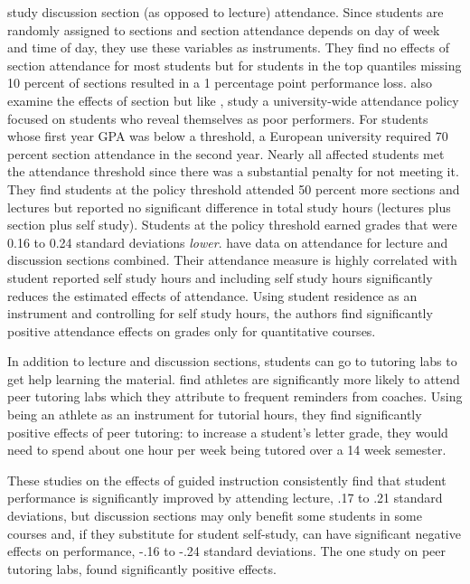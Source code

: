 \documentclass[12pt]{article}
\begin{document}
\textcite{ans2012} study discussion section (as opposed to lecture) attendance. Since students are randomly assigned to sections and section attendance depends on day of week and time of day, they use these variables as instruments. They find no effects of section attendance for most students but for students in the top quantiles missing 10 percent of sections resulted in a 1 percentage point performance loss. \textcite{kow2020} also examine the effects of section but like \textcite{dgm2010}, study a university-wide attendance policy focused on students who reveal themselves as poor performers. For students whose first year GPA was below a threshold, a European university required 70 percent section attendance in the second year. Nearly all affected students met the attendance threshold since there was a substantial penalty for not meeting it. They find students at the policy threshold attended 50 percent more sections and lectures but reported no significant difference in total study hours (lectures plus section plus self study). Students at the policy threshold earned grades that were 0.16 to 0.24 standard deviations \textit{lower}. \textcite{bs2013} have data on attendance for lecture and discussion sections combined. Their attendance measure is highly correlated with student reported self study hours and including self study hours significantly reduces the estimated effects of attendance. Using student residence as an instrument and controlling for self study hours, the authors find significantly positive attendance effects on grades only for quantitative courses.

In addition to lecture and discussion sections, students can go to tutoring labs to get help learning the material. \textcite{mgm2010} find athletes are significantly more likely to attend peer tutoring labs which they attribute to frequent reminders from coaches. Using being an athlete as an instrument for tutorial hours, they find significantly positive effects of peer tutoring: to increase a student's letter grade, they would need to spend about one hour per week being tutored over a 14 week semester.

These studies on the effects of guided instruction consistently find that student performance is significantly improved by attending lecture, .17 to .21 standard deviations, but discussion sections may only benefit some students in some courses and, if they substitute for student self-study, can have significant negative effects on performance, -.16 to -.24 standard deviations. The one study on peer tutoring labs, found significantly positive effects.
\end{document}
